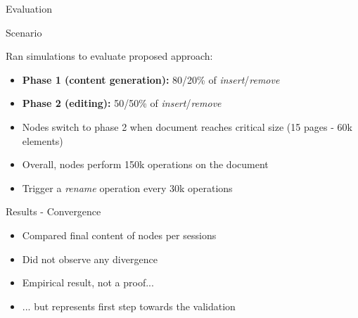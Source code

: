 \documentclass[10pt]{beamer}
\begin{document}

\begin{frame}[standout]
  Evaluation
\end{frame}


\begin{frame}{Scenario}
  \begin{block}{Ran simulations to evaluate proposed approach:}
    \begin{itemize}
      \item \textbf{Phase 1 (content generation):} 80/20\% of \emph{insert}/\emph{remove}
      \item \textbf{Phase 2 (editing):} 50/50\% of \emph{insert}/\emph{remove}
      \item Nodes switch to phase 2 when document reaches critical size (15 pages - 60k elements)
      \bigskip
      \item Overall, nodes perform 150k operations on the document
      \item Trigger a \emph{rename} operation every 30k operations
    \end{itemize}
  \end{block}
\end{frame}

\begin{frame}{Results - Convergence}
  \begin{itemize}
    \item Compared final content of nodes per sessions
    \item Did not observe any divergence
    \bigskip
    \item Empirical result, not a proof...
    \item ... but represents first step towards the validation
  \end{itemize}
\end{frame}
\end{document}
